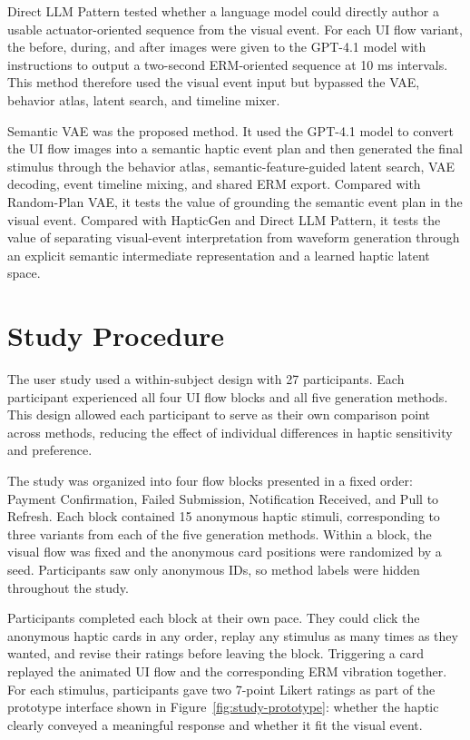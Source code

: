 Direct LLM Pattern tested whether a language model could directly author a usable actuator-oriented sequence from the visual event. For each UI flow variant, the before, during, and after images were given to the GPT-4.1 model with instructions to output a two-second ERM-oriented sequence at 10 ms intervals. This method therefore used the visual event input but bypassed the VAE, behavior atlas, latent search, and timeline mixer.

Semantic VAE was the proposed method. It used the GPT-4.1 model to convert the UI flow images into a semantic haptic event plan and then generated the final stimulus through the behavior atlas, semantic-feature-guided latent search, VAE decoding, event timeline mixing, and shared ERM export. Compared with Random-Plan VAE, it tests the value of grounding the semantic event plan in the visual event. Compared with HapticGen and Direct LLM Pattern, it tests the value of separating visual-event interpretation from waveform generation through an explicit semantic intermediate representation and a learned haptic latent space.

\section{Study Procedure}

The user study used a within-subject design with 27 participants. Each participant experienced all four UI flow blocks and all five generation methods. This design allowed each participant to serve as their own comparison point across methods, reducing the effect of individual differences in haptic sensitivity and preference.

The study was organized into four flow blocks presented in a fixed order: Payment Confirmation, Failed Submission, Notification Received, and Pull to Refresh. Each block contained 15 anonymous haptic stimuli, corresponding to three variants from each of the five generation methods. Within a block, the visual flow was fixed and the anonymous card positions were randomized by a seed. Participants saw only anonymous IDs, so method labels were hidden throughout the study.

Participants completed each block at their own pace. They could click the anonymous haptic cards in any order, replay any stimulus as many times as they wanted, and revise their ratings before leaving the block. Triggering a card replayed the animated UI flow and the corresponding ERM vibration together. For each stimulus, participants gave two 7-point Likert ratings as part of the prototype interface shown in Figure~\ref{fig:study-prototype}: whether the haptic clearly conveyed a meaningful response and whether it fit the visual event.

